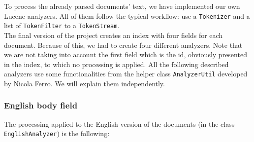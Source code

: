 To process the already parsed documents' text, we have implemented our own Lucene analyzers.
All of them follow the typical workflow: use a \texttt{Tokenizer} and a list of \texttt{TokenFilter} to a
\texttt{TokenStream}.\\

The final version of the project creates an index with four fields for each document.
Because of this, we had to create four different analyzers.
Note that we are not taking into account the first field which is the id, obviously presented in the index, to which no
processing is applied.
All the following described analyzers use some functionalities from the helper class \texttt{AnalyzerUtil} developed by
Nicola Ferro.
We will explain them independently.\\

\subsubsection{English body field}
The processing applied to the English version of the documents (in the class \texttt{EnglishAnalyzer}) is the following:
